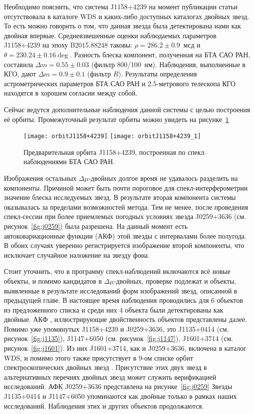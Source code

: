 Необходимо пояснить, что система J1158+4239 на момент публикации статьи отсутствовала в каталоге WDS и каких-либо доступных каталогах двойных звезд. То есть можно говорить о том, что данная звезда была детектирована нами как двойная впервые. Средневзвешенные оценки наблюдаемых параметров J1158+4239 на  эпоху B2015.88248 таковы: $\rho = 286.2\pm0.9$~мсд и $\theta=230.24\pm0.16\deg$. Разность блеска компонент, полученная на БТА САО РАН, составила $\Delta m = 0.55\pm0.03$ (фильтр 800/100~нм). Наблюдения, выполненные в КГО, дают $\Delta m = 0.9\pm0.1$ (фильтр $R$). Результаты определения астрометрических параметров БТА САО РАН и 2.5-метрового телескопа КГО находятся в хорошем согласии между собой.  

Сейчас ведутся дополнительные наблюдения данной системы с целью построения её орбиты. Промежуточный результат орбиты можно увидеть на рисунке~\ref{fig:orbit}


\begin{figure}
\centering
\texttt{[image: orbitJ1158+4239]}
\texttt{[image: orbitJ1158+4239\_1]}
\caption{Предварительная орбита J1158+4239, построенная по спекл--наблюдениями БТА САО РАН.}
\label{fig:orbit}
\end{figure}


Изображения остальных $\Delta\mu$-двойных долгое время не удавалось разделить на компоненты. Причиной может быть почти пороговое для спекл-интерферометрии значение блеска исследуемых звезд. В результате вторая компонента системы оказывалась за пределами возможностей метода. Тем не менее, после проведения спекл-сессии при более приемлемых погодных условиях звезда  J0259+3636 (см. рисунок~\ref{fig:j0259}) была разрешена. На данный момент есть автоковариационные функции (АКФ) этой звезды с интервалами более полугода. В обоих случаях уверенно регистрируется изображение второй компоненты, что исключает случайное наложение на звезду фона.

Стоит уточнить, что в программу спекл-наблюдений включаются всё новые объекты, и помимо кандидатов в $\Delta\mu$-двойных, проверке подлежат и объекты, выявленные в результате исследований форм изображений звезд, описанной в предыдущей главе. В настоящее время наблюдения проводились для 6 объектов из предложенного списка и среди них  4 объекта были детектированы как двойные. АКФ , иллюстрирующие двойственность объектов представлены далее. Помимо уже упомянутых J1158+4239 и J0259+3636, это  J1135+0414 (см. рисунок~\ref{fig:j1135}), J1147+6050 (см. рисунок~\ref{fig:j1147}), J1601+3714 (см. рисунок~\ref{fig:j1601}). Из них  J1601+3714, как и J0259+3636, включена в каталог WDS, и помимо этого также присутствует в 9-ом списке орбит спектроскопических двойных звезд . Присутствие этих двух звезд в альтернативных перечнях двойных звезд может служить верификацией исследований. АФК J0259+3636 представлена на рисунке~\ref{fig:j0259} Звезды J1135+0414 и J1147+6050 упоминаются как двойные только в рамках наших исследований. Наблюдения этих и других объектов продолжаются.

